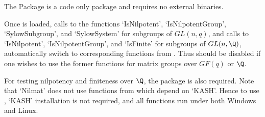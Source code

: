 

The Package  is a {\GAP} code only package and requires
no external binaries.

Once  is loaded, calls to the {\GAP} functions
`IsNilpotent', `IsNilpotentGroup', `SylowSubgroup', and
`SylowSystem' for subgroups of $GL(n,q)$, and calls to
`IsNilpotent', `IsNilpotentGroup', and `IsFinite' for subgroups of
$GL(n,\Q)$, automatically switch to corresponding functions
from . Thus  should be disabled if
one wishes to use the former {\GAP} functions for matrix groups
over $GF(q)$ or $\Q$.

For testing nilpotency and finiteness over $\Q$, the {\GAP}
package  is also required. Note that `Nilmat'
does not use functions from  which depend on
`KASH'. Hence to use , `KASH' installation is not
required, and all  functions run under both
Windows and Linux.

